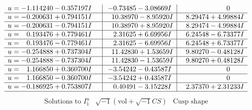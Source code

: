 \documentclass[1p]{elsarticle_modified}
\theoremstyle{definition}
\newcommand{\I}{\sqrt{-1}}
\begin{document}
$$\begin{array}{c|c|c}
\begin{aligned}
u &= -1.114240 - 0.357197 I\end{aligned}
 & -0.73485 - 3.08669 I & \phantom{-0.000000 } 0 \\ \hline\begin{aligned}
u &= -0.200631 + 0.794151 I\end{aligned}
 & \phantom{-}10.38970 - 8.95920 I & \phantom{-}8.29474 + 4.99884 I \\ \hline\begin{aligned}
u &= -0.200631 - 0.794151 I\end{aligned}
 & \phantom{-}10.38970 + 8.95920 I & \phantom{-}8.29474 - 4.99884 I \\ \hline\begin{aligned}
u &= \phantom{-}0.193476 + 0.779461 I\end{aligned}
 & \phantom{-}2.31625 + 6.69956 I & \phantom{-}6.24548 - 6.73377 I \\ \hline\begin{aligned}
u &= \phantom{-}0.193476 - 0.779461 I\end{aligned}
 & \phantom{-}2.31625 - 6.69956 I & \phantom{-}6.24548 + 6.73377 I \\ \hline\begin{aligned}
u &= -0.254888 + 0.737304 I\end{aligned}
 & \phantom{-}11.42830 + 1.53659 I & \phantom{-}9.80270 - 0.48128 I \\ \hline\begin{aligned}
u &= -0.254888 - 0.737304 I\end{aligned}
 & \phantom{-}11.42830 - 1.53659 I & \phantom{-}9.80270 + 0.48128 I \\ \hline\begin{aligned}
u &= \phantom{-}1.166850 + 0.360700 I\end{aligned}
 & -3.54242 - 0.43587 I & \phantom{-0.000000 } 0 \\ \hline\begin{aligned}
u &= \phantom{-}1.166850 - 0.360700 I\end{aligned}
 & -3.54242 + 0.43587 I & \phantom{-0.000000 } 0 \\ \hline\begin{aligned}
u &= -0.186925 + 0.753807 I\end{aligned}
 & \phantom{-}0.40491 - 3.15228 I & \phantom{-}2.37370 + 2.31233 I\\
 \hline 
 \end{array}$$\newpage$$\begin{array}{c|c|c}  
\text{Solutions to }I^u_{1}& \I (\text{vol} + \sqrt{-1}CS) & \text{Cusp shape}\\

\end{array}$$
\end{document}
